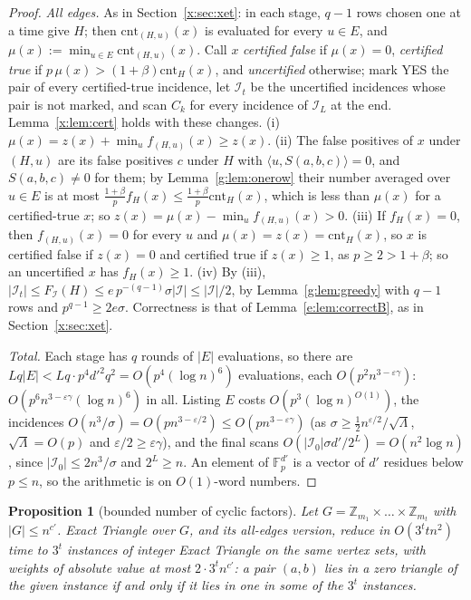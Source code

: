 \documentclass[11pt]{article}
\newtheorem{proposition}[theorem]{Proposition}
\theoremstyle{definition}
\theoremstyle{remark}
\newcommand{\Z}{\mathbb{Z}}
\newcommand{\Fp}{\mathbb{F}_p}
\newcommand{\eps}{\varepsilon}
\newcommand{\cnt}{\mathrm{cnt}}
\newcommand{\Iq}{\mathcal{I}}
\begin{document}
\begin{proof}
\emph{All edges.} As in Section~\ref{x:sec:xet}: in each stage, $q-1$ rows chosen one at a time give $H$; then $\cnt_{(H,u)}(x)$ is evaluated for every $u\in E$, and $\mu(x):=\min_{u\in E}\cnt_{(H,u)}(x)$. Call $x$ \emph{certified false} if $\mu(x)=0$, \emph{certified true} if $p\,\mu(x)>(1+\beta)\cnt_H(x)$, and \emph{uncertified} otherwise; mark YES the pair of every certified-true incidence, let $\Iq_t$ be the uncertified incidences whose pair is not marked, and scan $C_k$ for every incidence of $\Iq_L$ at the end. Lemma~\ref{x:lem:cert} holds with these changes. (i) $\mu(x)=z(x)+\min_uf_{(H,u)}(x)\ge z(x)$. (ii) The false positives of $x$ under $(H,u)$ are its false positives $c$ under $H$ with $\langle u,S(a,b,c)\rangle=0$, and $S(a,b,c)\ne0$ for them; by Lemma~\ref{g:lem:onerow} their number averaged over $u\in E$ is at most $\frac{1+\beta}pf_H(x)\le\frac{1+\beta}p\cnt_H(x)$, which is less than $\mu(x)$ for a certified-true $x$; so $z(x)=\mu(x)-\min_uf_{(H,u)}(x)>0$. (iii) If $f_H(x)=0$, then $f_{(H,u)}(x)=0$ for every $u$ and $\mu(x)=z(x)=\cnt_H(x)$, so $x$ is certified false if $z(x)=0$ and certified true if $z(x)\ge1$, as $p\ge2>1+\beta$; so an uncertified $x$ has $f_H(x)\ge1$. (iv) By (iii), $|\Iq_t|\le F_\Iq(H)\le e\,p^{-(q-1)}\sigma|\Iq|\le|\Iq|/2$, by Lemma~\ref{g:lem:greedy} with $q-1$ rows and $p^{q-1}\ge2e\sigma$. Correctness is that of Lemma~\ref{e:lem:correctB}, as in Section~\ref{x:sec:xet}.

\emph{Total.} Each stage has $q$ rounds of $|E|$ evaluations, so there are $Lq|E|<Lq\cdot p^4d'^2q^2=O(p^4(\log n)^6)$ evaluations, each $O(p^2n^{3-\eps\gamma})$: $O(p^6n^{3-\eps\gamma}(\log n)^6)$ in all. Listing $E$ costs $O(p^3(\log n)^{O(1)})$, the incidences $O(n^3/\sigma)=O(pn^{3-\eps/2})\le O(pn^{3-\eps\gamma})$ (as $\sigma\ge\frac12n^{\eps/2}/\sqrt\Lambda$, $\sqrt\Lambda=O(p)$ and $\eps/2\ge\eps\gamma$), and the final scans $O(|\Iq_0|\sigma d'/2^L)=O(n^2\log n)$, since $|\Iq_0|\le2n^3/\sigma$ and $2^L\ge n$. An element of $\Fp^{d'}$ is a vector of $d'$ residues below $p\le n$, so the arithmetic is on $O(1)$-word numbers.
\end{proof}

\begin{proposition}[bounded number of cyclic factors]\label{g:prop:triboundedrank}
Let $G=\Z_{m_1}\times\dots\times\Z_{m_t}$ with $|G|\le n^{c'}$. Exact Triangle over $G$, and its all-edges version, reduce in $O(3^ttn^2)$ time to $3^t$ instances of integer Exact Triangle on the same vertex sets, with weights of absolute value at most $2\cdot3^tn^{c'}$: a pair $(a,b)$ lies in a zero triangle of the given instance if and only if it lies in one in some of the $3^t$ instances.
\end{proposition}
\end{document}
